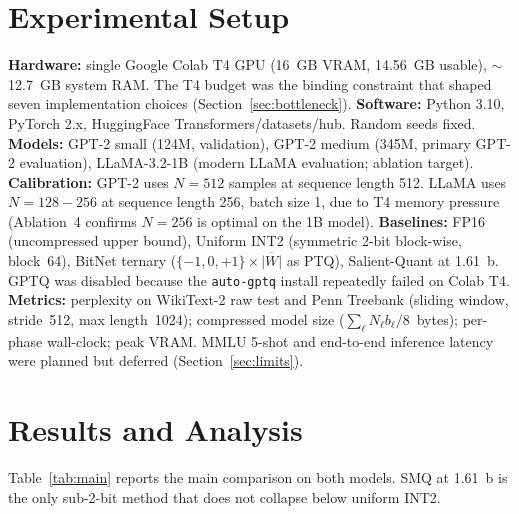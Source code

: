 \documentclass[11pt]{article}
\begin{document}
\section{Experimental Setup}
\label{sec:setup}

\textbf{Hardware:} single Google Colab T4 GPU (16~GB VRAM, 14.56~GB usable),
$\sim$12.7~GB system RAM.
The T4 budget was the binding constraint that shaped seven implementation choices
(Section~\ref{sec:bottleneck}).
\textbf{Software:} Python 3.10, PyTorch 2.x, HuggingFace Transformers/datasets/hub.
Random seeds fixed.
\textbf{Models:}
GPT-2 small (124M, validation), GPT-2 medium (345M, primary GPT-2 evaluation), LLaMA-3.2-1B
(modern LLaMA evaluation; ablation target).
\textbf{Calibration:} GPT-2 uses $N{=}512$ samples at sequence length 512.
LLaMA uses $N{=}128{-}256$ at sequence length 256, batch size 1, due to T4 memory pressure
(Ablation~4 confirms $N{=}256$ is optimal on the 1B model).
\textbf{Baselines:} FP16 (uncompressed upper bound), Uniform INT2 (symmetric 2-bit
block-wise, block~64), BitNet ternary ($\{-1, 0, +1\} \times \overline{|W|}$ as PTQ),
Salient-Quant at 1.61~b.
GPTQ was disabled because the \texttt{auto-gptq} install repeatedly failed on Colab T4.
\textbf{Metrics:} perplexity on WikiText-2 raw test and Penn Treebank (sliding window,
stride~512, max length~1024); compressed model size ($\sum_\ell N_\ell b_\ell / 8$~bytes);
per-phase wall-clock; peak VRAM.
MMLU 5-shot and end-to-end inference latency were planned but deferred
(Section~\ref{sec:limits}).

\section{Results and Analysis}
\label{sec:results}

Table~\ref{tab:main} reports the main comparison on both models.
SMQ at 1.61~b is the only sub-2-bit method that does not collapse below uniform INT2.
\end{document}
